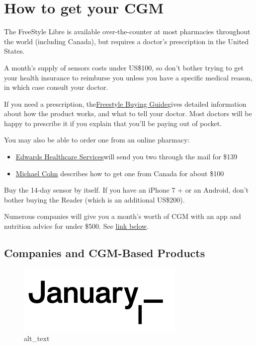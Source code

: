 \documentclass[
]{book}
\providecommand{\tightlist}{%
  \setlength{\itemsep}{0pt}\setlength{\parskip}{0pt}}
\begin{document}
\hypertarget{how-to-get-your-cgm}{%
\chapter{How to get your CGM}\label{how-to-get-your-cgm}}

The FreeStyle Libre is available over-the-counter at most pharmacies throughout the world (including Canada), but requires a doctor's prescription in the United States.

A month's supply of sensors costs under US\$100, so don't bother trying to get your health insurance to reimburse you unless you have a specific medical reason, in which case consult your doctor.

If you need a prescription, the\href{https://www.freestylelibre.us/support/buying-guide.html}{Freestyle Buying Guide}gives detailed information about how the product works, and what to tell your doctor. Most doctors will be happy to prescribe it if you explain that you'll be paying out of pocket.

You may also be able to order one from an online pharmacy:

\begin{itemize}
\tightlist
\item
  \href{https://www.myehcs.com/diabetes/continuous-glucose-monitors/howcgmswork/}{Edwards Healthcare Services}will send you two through the mail for \$139
\item
  \href{https://octern.medium.com/how-to-get-a-continuous-glucose-monitor-d48cd229e9ac}{Michael Cohn} describes how to get one from Canada for about \$100
\end{itemize}

Buy the 14-day sensor by itself. If you have an iPhone 7 + or an Android, don't bother buying the Reader (which is an additional US\$200).

Numerous companies will give you a month's worth of CGM with an app and nutrition advice for under \$500. See \protect\hyperlink{bookmark=id.d7g3e8qlegnl}{link below}.

\hypertarget{companies-and-cgm-based-products}{%
\section{Companies and CGM-Based Products}\label{companies-and-cgm-based-products}}

\begin{figure}
\centering
\includegraphics{images/january-logo.png}
\caption{alt\_text}
\end{figure}
\end{document}
